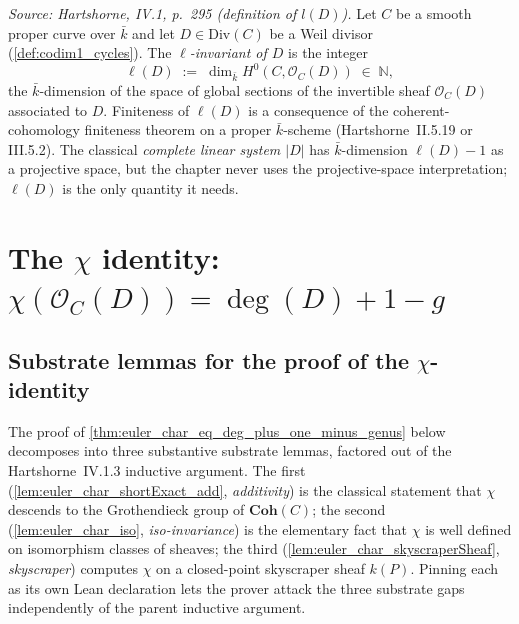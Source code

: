 \begin{definition}


  \label{def:l_invariant}

  \textit{Source: Hartshorne, IV.1, p.~295 (definition of \(l(D)\)).}
  Let \(C\) be a smooth proper curve over \(\bar k\) and let
  \(D \in \mathrm{Div}(C)\) be a Weil divisor (\cref{def:codim1_cycles}). The
  \emph{\(\ell\)-invariant of \(D\)} is the integer
  \[
    \ell(D) \;:=\; \dim_{\bar k} H^0(C, \mathcal O_C(D))
    \;\in\; \mathbb N,
  \]
  the \(\bar k\)-dimension of the space of global sections of the
  invertible sheaf \(\mathcal O_C(D)\) associated to \(D\). Finiteness of
  \(\ell(D)\) is a consequence of the coherent-cohomology finiteness
  theorem on a proper \(\bar k\)-scheme (Hartshorne~II.5.19 or
  III.5.2). The classical \emph{complete linear system \(|D|\)} has
  \(\bar k\)-dimension \(\ell(D) - 1\) as a projective space, but the
  chapter never uses the projective-space interpretation; \(\ell(D)\) is
  the only quantity it needs.

\end{definition}

\section{The \(\chi\) identity: \(\chi(\mathcal O_C(D)) = \deg(D) + 1 - g\)}

\subsection*{Substrate lemmas for the proof of the \(\chi\)-identity}

The proof of \cref{thm:euler_char_eq_deg_plus_one_minus_genus} below
decomposes into three substantive substrate lemmas, factored out of the
Hartshorne~IV.1.3 inductive argument. The first
(\cref{lem:euler_char_shortExact_add}, \emph{additivity}) is the
classical statement that \(\chi\) descends to the Grothendieck group
of \(\mathbf{Coh}(C)\); the second
(\cref{lem:euler_char_iso}, \emph{iso-invariance}) is the
elementary fact that \(\chi\) is well defined on isomorphism classes
of sheaves; the third
(\cref{lem:euler_char_skyscraperSheaf}, \emph{skyscraper}) computes \(\chi\)
on a closed-point skyscraper sheaf \(k(P)\). Pinning each as its own
Lean declaration lets the prover attack the three substrate gaps
independently of the parent inductive argument.

